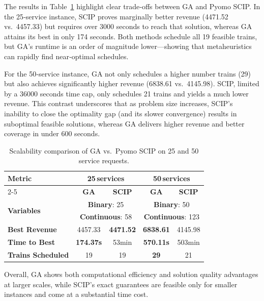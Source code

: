 \documentclass[Afour,sagev,times]{sagej}
\begin{document}
The results in Table~\ref{tab:scalability} highlight clear trade‐offs between GA and Pyomo SCIP. In the 25‐service instance, SCIP proves marginally better revenue (4471.52 vs.\ 4457.33) but requires over 3000 seconds to reach that solution, whereas GA attains its best in only 174 seconds. Both methods schedule all 19 feasible trains, but GA's runtime is an order of magnitude lower—showing that metaheuristics can rapidly find near‐optimal schedules.

For the 50‐service instance, GA not only schedules a higher number trains (29) but also achieves significantly higher revenue (6838.61 vs.\ 4145.98). SCIP, limited by a 36000 seconds time cap, only schedules 21 trains and yields a much lower revenue. This contrast underscores that as problem size increases, SCIP's inability to close the optimality gap (and its slower convergence) results in suboptimal feasible solutions, whereas GA delivers higher revenue and better coverage in under 600 seconds.

\begin{table}[htbp]
\centering
\scriptsize
\caption{Scalability comparison of GA vs.\ Pyomo SCIP on 25 and 50 service requests.}
\begin{tabular}{|l|cc|cc|}
\hline
\multirow{2}{*}{\textbf{Metric}} & \multicolumn{2}{c|}{\textbf{25\,services}} & \multicolumn{2}{c|}{\textbf{50\,services}} \\ \cline{2-5}
& \textbf{GA}       & \textbf{SCIP}       & \textbf{GA}       & \textbf{SCIP}        \\ \hline
\multirow{2}{*}{\textbf{Variables}} & \multicolumn{2}{c|}{\textbf{Binary}: 25} & \multicolumn{2}{c|}{\textbf{Binary}: 50} \\ 
& \multicolumn{2}{c|}{\textbf{Continuous}: 58} & \multicolumn{2}{c|}{\textbf{Continuous}: 123} \\ \hline
\textbf{Best Revenue} & 4457.33 & \textbf{4471.52} & \textbf{6838.61} & 4145.98 \\ \hline
\textbf{Time to Best}  & \textbf{174.37s} & 53min & \textbf{570.11s} & 503min  \\ \hline
\textbf{Trains Scheduled} & 19 & 19 & \textbf{29} & 21 \\ \hline
\end{tabular}
\label{tab:scalability}
\end{table}

Overall, GA shows both computational efficiency and solution quality advantages at larger scales, while SCIP’s exact guarantees are feasible only for smaller instances and come at a substantial time cost.
\end{document}

